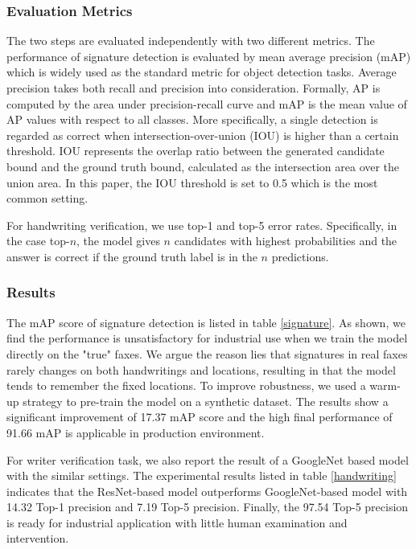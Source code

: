 \documentclass[sigconf]{acmart}
\begin{document}
\subsubsection*{\rm \textbf{Evaluation Metrics}}
The two steps are evaluated independently with two different metrics. The performance of signature detection is evaluated by mean average precision (mAP) which is widely used as the standard metric for object detection tasks. Average precision takes both recall and precision into consideration. Formally, AP is computed by the area under precision-recall curve and mAP is the mean value of AP values with respect to all classes. More specifically, a single detection is regarded as correct when intersection-over-union (IOU) is higher than a certain threshold. IOU represents the overlap ratio between the generated candidate bound and the ground truth bound, calculated as the intersection area over the union area. In this paper, the IOU threshold is set to 0.5 which is the most common setting. 

For handwriting verification, we use top-1 and top-5 error rates. Specifically, in the case top-$n$, the model gives $n$ candidates with highest probabilities and the answer is correct if the ground truth label is in the $n$ predictions. 
\subsubsection*{\rm \textbf{Results}}
The mAP score of signature detection is listed in table \ref{signature}. As shown, we find the performance is unsatisfactory for industrial use when we train the model directly on the "true" faxes. We argue the reason lies that signatures in real faxes rarely changes on both handwritings and locations, resulting in that the model tends to remember the fixed locations. To improve robustness, we used a warm-up strategy to pre-train the model on a synthetic dataset. The results show a significant improvement of 17.37 mAP score and the high final performance of 91.66 mAP is applicable in production environment.

For writer verification task, we also report the result of a GoogleNet based model \cite{szegedy2015going} with the similar settings. The experimental results listed in table \ref{handwriting} indicates that the ResNet-based model outperforms GoogleNet-based model with 14.32 Top-1 precision and 7.19 Top-5 precision. Finally, the 97.54 Top-5 precision is ready for industrial application with little human examination and intervention.
\end{document}
